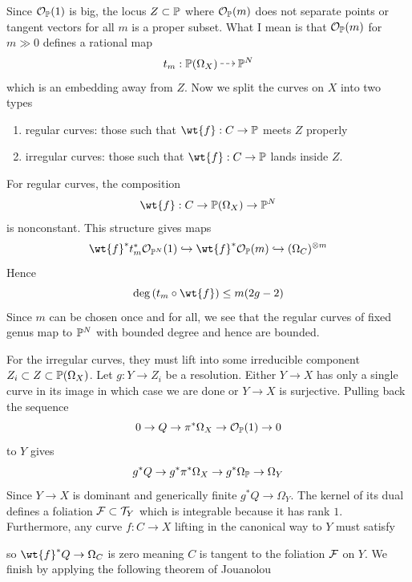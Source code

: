 \documentclass[main.tex]{subfiles}
\begin{document}
Since $\struct{\P}(1)$ is big, the locus $Z \subset \P$ where $\struct{\P}(m)$ does not separate points or tangent vectors for all $m$ is a proper subset. What I mean is that $\struct{\P}(m)$ for $m \gg 0$ defines a rational map
\[ t_m : \P(\Omega_X) \rat \P^N  \]
which is an embedding away from $Z$. Now we split the curves on $X$ into two types
\begin{enumerate}
\item regular curves: those such that $\wt{f} : C \to \P$ meets $Z$ properly
\item irregular curves: those such that $\wt{f} : C \to \P$ lands inside $Z$.
\end{enumerate}

For regular curves, the composition
\[ \wt{f} : C \to \P(\Omega_X) \to \P^N \]
is nonconstant. This structure gives maps
\[ \wt{f}^* t_m^* \struct{\P^N}(1) \embed \wt{f}^* \struct{\P}(m) \embed (\Omega_C)^{\ot m} \]
Hence
\[ \deg{(t_m \circ \wt{f})} \le m (2g - 2) \]
Since $m$ can be chosen once and for all, we see that the regular curves of fixed genus map to $\P^N$ with bounded degree and hence are bounded.
\par
For the irregular curves, they must lift into some irreducible component $Z_i \subset Z \subset \P(\Omega_X)$. Let $g : Y \to Z_i$ be a resolution. Either $Y \to X$ has only a single curve in its image in which case we are done or $Y \to X$ is surjective. Pulling back the sequence
\[ 0 \to Q \to \pi^* \Omega_X \to \struct{\P}(1) \to 0 \]
to $Y$ gives
\[ g^* Q \to g^* \pi^* \Omega_X \to g^* \Omega_{\P} \to \Omega_Y \]
Since $Y \to X$ is dominant and generically finite $g^* Q \to \Omega_Y$. The kernel of its dual defines a foliation $\F \subset \T_Y$ which is integrable because it has rank $1$. Furthermore, any curve $f : C \to X$ lifting in the canonical way to $Y$ must satisfy
\begin{center}
\end{center}
so $\wt{f}^* Q \to \Omega_C$ is zero meaning $C$ is tangent to the foliation $\F$ on $Y$. We finish by applying the following theorem of Jouanolou
\end{document}
